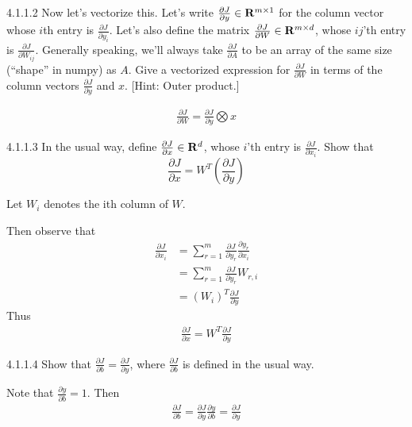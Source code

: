\documentclass[12pt,letterpaper]{article}
\begin{document}
\begin{problem}{4.1.1.2}
    Now let's vectorize this. Let's write $\frac{\partial J}{\partial y}\in\mathbf{R}^{m\times1}$
    for the column vector whose $i$th entry is $\frac{\partial J}{\partial y_{i}}$.
    Let's also define the matrix $\frac{\partial J}{\partial W}\in\mathbf{R}^{m\times d}$,
    whose $ij$'th entry is $\frac{\partial J}{\partial W_{ij}}$. Generally
    speaking, we'll always take $\frac{\partial J}{\partial A}$ to be
    an array of the same size (``shape'' in numpy) as $A$. Give a vectorized
    expression for $\frac{\partial J}{\partial W}$ in terms of the column
    vectors $\frac{\partial J}{\partial y}$ and $x$. {[}Hint: Outer
    product.{]} 
\end{problem}
\begin{solution}{}
    \begin{align*}
        \frac{\partial J}{\partial W} = \frac{\partial J}{\partial y} \bigotimes x
    \end{align*}
\end{solution}
\newpage

\begin{problem}{4.1.1.3}
    In the usual way, define $\frac{\partial J}{\partial x}\in\mathbf{R}^{d}$,
    whose $i$'th entry is $\frac{\partial J}{\partial x_{i}}$. Show
    that 
    \[
    \frac{\partial J}{\partial x}=W^{T}\left(\frac{\partial J}{\partial y}\right)
    \]
\end{problem}
\begin{solution}
    Let $W_i$ denotes the ith column of $W$.
    
    Then observe that
    \begin{align*}
        \frac{\partial J}{\partial x_i} &= \sum_{r=1}^m \frac{\partial J}{\partial y_r}\frac{\partial y_r}{\partial x_i}\\
        &=\sum_{r=1}^m \frac{\partial J}{\partial y_r}W_{r,i}\\
        &= \left(W_i\right)^T\frac{\partial J}{\partial y} 
    \end{align*}
    Thus
    \begin{align*}
        \frac{\partial J}{\partial x} = W^T\frac{\partial J}{\partial y}
    \end{align*}
\end{solution}
\newpage

\begin{problem}{4.1.1.4}
    Show that $\frac{\partial J}{\partial b}=\frac{\partial J}{\partial y}$,
    where $\frac{\partial J}{\partial b}$ is defined in the usual way.
\end{problem}
\begin{solution}{}
    Note that $\frac{\partial y}{\partial b} = 1$. Then
    \begin{align*}
        \frac{\partial J}{\partial b} = \frac{\partial J}{\partial y}\frac{\partial y}{\partial b} = \frac{\partial J}{\partial y}
    \end{align*}
\end{solution}
\newpage
\end{document}
